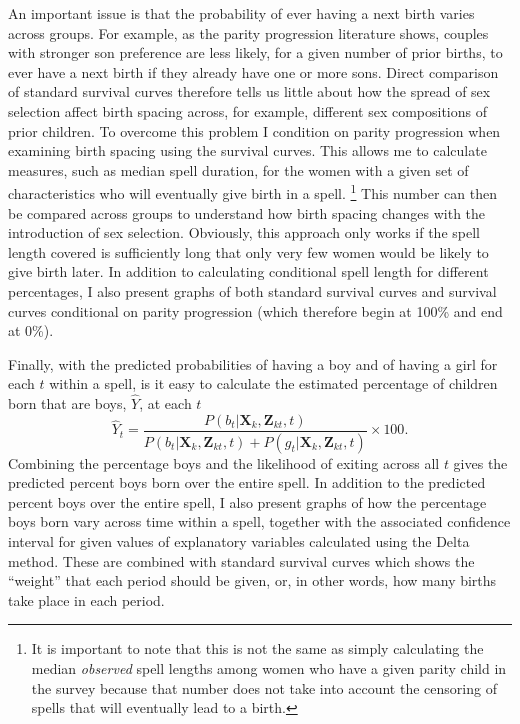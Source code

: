 \documentclass[12pt,letterpaper]{article}
\begin{document}
An important issue is that the probability of ever having a next birth varies 
across groups.
For example, as the parity progression literature shows, couples with stronger 
son preference are less likely, for a given number of prior births, to ever have 
a next birth if they already have one or more sons.
Direct comparison of standard survival curves therefore tells us little 
about how the spread of sex selection affect birth spacing across, for
example, different sex compositions of prior children.
To overcome this problem I condition on parity progression when examining
birth spacing using the survival curves.
This allows me to calculate measures, such as median spell duration, for
the women with a given set of characteristics who will eventually give
birth in a spell.%
\footnote{
It is important to note that this is not the same as simply calculating 
the median \emph{observed} spell lengths among women who have a given 
parity child in the survey because that number does not take into account
the censoring of spells that will eventually lead to a birth.
}
This number can then be compared across groups to understand how birth
spacing changes with the introduction of sex selection.
Obviously, this approach only works if the spell length covered is 
sufficiently long that only very few women would be likely to give
birth later.
In addition to calculating conditional spell length for different 
percentages, I also present graphs of both standard survival curves and
survival curves conditional on parity progression (which therefore
begin at 100\% and end at 0\%).


Finally, with the predicted probabilities of having a boy and of having 
a girl for each $t$ within a spell, is it easy to calculate the estimated 
percentage of children born that are boys, $\hat{Y}$, at each $t$  
\begin{equation}
\hat{Y}_t 
= 
\frac{ P(b_{t} | \mathbf{X}_{k}, \mathbf{Z}_{kt},t )}
{ P(b_{t} | \mathbf{X}_{k}, \mathbf{Z}_{kt},t) + P(g_{t} | \mathbf{X}_{k}, \mathbf{Z}_{kt},t )} 
\times 100.
\label{eq:probability_son}
\end{equation}
Combining the percentage boys and the likelihood of exiting across all $t$ 
gives the predicted percent boys born over the entire spell.
In addition to the predicted percent boys over the entire spell, 
I also present graphs of how the percentage boys born vary across time
within a spell, together with the associated confidence interval for given 
values of explanatory variables calculated using the Delta method.
These are combined with standard survival curves which shows the ``weight''
that each period should be given, or, in other words, how many births take
place in each period.
\end{document}
